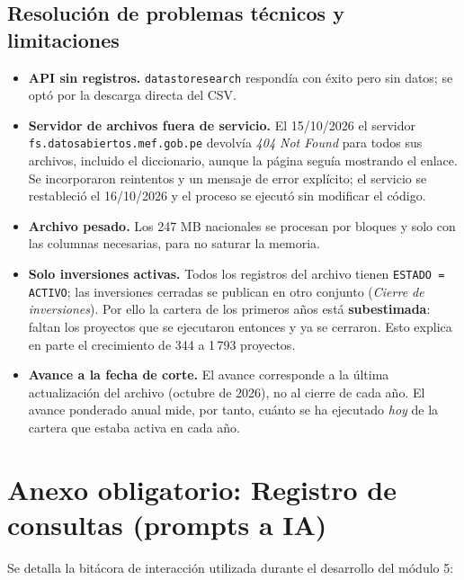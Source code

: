 \documentclass[12pt,a4paper]{article}
\newcommand{\var}[1]{{\renewcommand{\_}{\textunderscore\allowbreak}\texttt{#1}}}
\begin{document}
\subsection{Resolución de problemas técnicos y limitaciones}

\begin{itemize}
  \item \textbf{API sin registros.} \var{datastore\_search} respondía con éxito pero sin
        datos; se optó por la descarga directa del CSV.
  \item \textbf{Servidor de archivos fuera de servicio.} El 15/10/2026 el servidor
        \var{fs.datosabiertos.mef.gob.pe} devolvía \emph{404 Not Found} para todos sus
        archivos, incluido el diccionario, aunque la página seguía mostrando el enlace. Se
        incorporaron reintentos y un mensaje de error explícito; el servicio se restableció
        el 16/10/2026 y el proceso se ejecutó sin modificar el código.
  \item \textbf{Archivo pesado.} Los 247 MB nacionales se procesan por bloques y solo con
        las columnas necesarias, para no saturar la memoria.
  \item \textbf{Solo inversiones activas.} Todos los registros del archivo tienen
        \var{ESTADO = ACTIVO}; las inversiones cerradas se publican en otro conjunto
        (\emph{Cierre de inversiones}). Por ello la cartera de los primeros años está
        \textbf{subestimada}: faltan los proyectos que se ejecutaron entonces y ya se
        cerraron. Esto explica en parte el crecimiento de 344 a 1\,793 proyectos.
  \item \textbf{Avance a la fecha de corte.} El avance corresponde a la última
        actualización del archivo (octubre de 2026), no al cierre de cada año. El avance
        ponderado anual mide, por tanto, cuánto se ha ejecutado \emph{hoy} de la cartera
        que estaba activa en cada año.
\end{itemize}

\section*{Anexo obligatorio: Registro de consultas (prompts a IA)}

Se detalla la bitácora de interacción utilizada durante el desarrollo del módulo 5:
\end{document}
